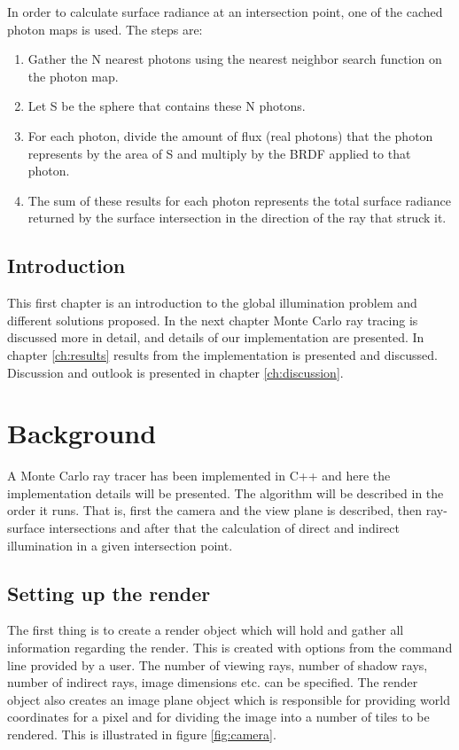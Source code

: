 \documentclass[a4paper]{report}
\begin{document}
In order to calculate surface radiance at an intersection point, one
of the cached photon maps is used. The steps are:

\begin{enumerate}
\item{Gather the N nearest photons using the nearest neighbor search function on the photon map.}
\item{Let S be the sphere that contains these N photons.}
\item {For each photon, divide the amount of flux (real photons) that
    the photon represents by the area of S and multiply by the BRDF applied to that photon.}
\item{The sum of these results for each photon represents the total
    surface radiance returned by the surface intersection in the
    direction of the ray that struck it.}
\end{enumerate}

\section{Introduction}
This first chapter is an introduction to the global illumination problem and different
solutions proposed. In the next chapter Monte Carlo ray tracing is
discussed more in detail, and details of our implementation are
presented. In chapter \ref{ch:results} results from the implementation
is presented and discussed. Discussion and outlook is presented in chapter \ref{ch:discussion}. 

\chapter{Background}

A Monte Carlo ray tracer has been implemented in C++ and here the
implementation details will be presented. The algorithm will be
described in the order it runs. That is, first the camera and the view
plane is described, then ray-surface intersections and after that the
calculation of direct and indirect illumination in a given
intersection point.

\section{Setting up the render}

The first thing is to create a render object which will hold and
gather all information regarding the render. This is created with
options from the command line provided by a user. The number of
viewing rays, number of shadow rays, number of indirect rays, image
dimensions etc. can be specified. The render object also creates an
image plane object which is responsible for providing world
coordinates for a pixel and for dividing the image into a number of
tiles to be rendered. This is illustrated in figure
\ref{fig:camera}.
\end{document}
